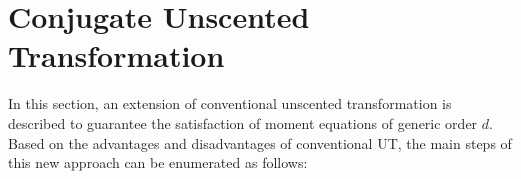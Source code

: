 \documentclass[letterpaper, 10 pt, conference]{IEEEtran}  %
\begin{document}
\section{Conjugate Unscented Transformation}
In this section, an extension of conventional unscented transformation is described to guarantee the satisfaction of moment equations of generic order $d$. Based on the advantages and disadvantages of conventional UT, the main steps of this new approach can be enumerated as follows:
\end{document}
